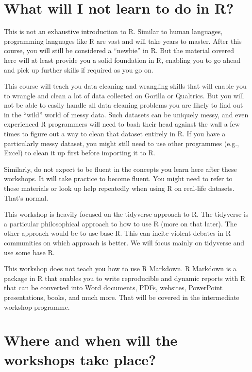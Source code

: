 \documentclass[
]{book}
\begin{document}
\hypertarget{what-will-i-not-learn-to-do-in-r}{%
\section{What will I not learn to do in R?}\label{what-will-i-not-learn-to-do-in-r}}

This is not an exhaustive introduction to R. Similar to human languages, programming languages like R are vast and will take years to master. After this course, you will still be considered a ``newbie'' in R. But the material covered here will at least provide you a solid foundation in R, enabling you to go ahead and pick up further skills if required as you go on.

This course will teach you data cleaning and wrangling skills that will enable you to wrangle and clean a lot of data collected on Gorilla or Qualtrics. But you will not be able to easily handle all data cleaning problems you are likely to find out in the ``wild'' world of messy data. Such datasets can be uniquely messy, and even experienced R programmers will need to bash their head against the wall a few times to figure out a way to clean that dataset entirely in R. If you have a particularly messy dataset, you might still need to use other programmes (e.g., Excel) to clean it up first before importing it to R.

Similarly, do not expect to be fluent in the concepts you learn here after these workshops. It will take practice to become fluent. You might need to refer to these materials or look up help repeatedly when using R on real-life datasets. That's normal.

This workshop is heavily focused on the tidyverse approach to R. The tidyverse is a particular philosophical approach to how to use R (more on that later). The other approach would be to use base R. This can incite violent debates in R communities on which approach is better. We will focus mainly on tidyverse and use some base R.

This workshop does not teach you how to use R Markdown. R Markdown is a package in R that enables you to write reproducible and dynamic reports with R that can be converted into Word documents, PDFs, websites, PowerPoint presentations, books, and much more. That will be covered in the intermediate workshop programme.

\hypertarget{where-and-when-will-the-workshops-take-place}{%
\section{Where and when will the workshops take place?}\label{where-and-when-will-the-workshops-take-place}}
\end{document}

